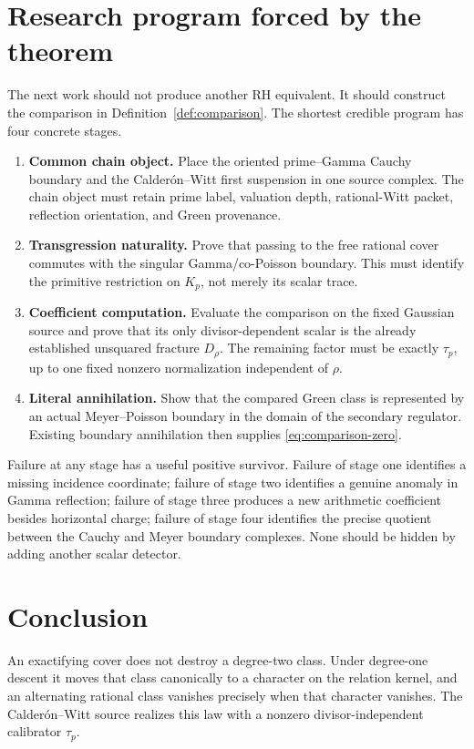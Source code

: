 \documentclass[11pt]{article}
\theoremstyle{definition}
\theoremstyle{remark}
\numberwithin{equation}{section}
\begin{document}
\section{Research program forced by the theorem}

The next work should not produce another RH equivalent.  It should construct
the comparison in Definition~\ref{def:comparison}.  The shortest credible
program has four concrete stages.

\begin{enumerate}
\item \textbf{Common chain object.}  Place the oriented prime--Gamma Cauchy
boundary and the Calder\'on--Witt first suspension in one source complex.
The chain object must retain prime label, valuation depth, rational-Witt
packet, reflection orientation, and Green provenance.
\item \textbf{Transgression naturality.}  Prove that passing to the free
rational cover commutes with the singular Gamma/co-Poisson boundary.  This
must identify the primitive restriction on $K_p$, not merely its scalar
trace.
\item \textbf{Coefficient computation.}  Evaluate the comparison on the
fixed Gaussian source and prove that its only divisor-dependent scalar is
the already established unsquared fracture $D_\rho$.  The remaining factor
must be exactly $\tau_p$, up to one fixed nonzero normalization independent
of $\rho$.
\item \textbf{Literal annihilation.}  Show that the compared Green class is
represented by an actual Meyer--Poisson boundary in the domain of the
secondary regulator.  Existing boundary annihilation then supplies
\eqref{eq:comparison-zero}.
\end{enumerate}

Failure at any stage has a useful positive survivor.  Failure of stage one
identifies a missing incidence coordinate; failure of stage two identifies
a genuine anomaly in Gamma reflection; failure of stage three produces a
new arithmetic coefficient besides horizontal charge; failure of stage four
identifies the precise quotient between the Cauchy and Meyer boundary
complexes.  None should be hidden by adding another scalar detector.

\section{Conclusion}

An exactifying cover does not destroy a degree-two class.  Under degree-one
descent it moves that class canonically to a character on the relation
kernel, and an alternating rational class vanishes precisely when that
character vanishes.  The Calder\'on--Witt source realizes this law with a
nonzero divisor-independent calibrator $\tau_p$.
\end{document}
